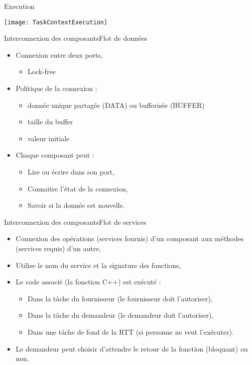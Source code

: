 \documentclass[compress]{beamer}
\begin{document}
\begin{frame}{Execution}
\begin{center}
\texttt{[image: TaskContextExecution]}
\end{center}
\end{frame}

\begin{frame}{Interconnexion des composants}{Flot de données}
\begin{itemize}
\item Connexion entre deux ports,
	\begin{itemize}
	\item Lock-free
	\end{itemize}
\item Politique de la connexion :
	\begin{itemize}
	\item donnée unique partagée (DATA) ou bufferisée (BUFFER)
	\item taille du buffer
	\item valeur initiale
	\end{itemize}
\item Chaque composant peut :
	\begin{itemize}
	\item Lire ou écrire dans son port,
	\item Connaitre l'état de la connexion,
	\item Savoir si la donnée  est nouvelle.
	\end{itemize}
\end{itemize}
\end{frame}

\begin{frame}{Interconnexion des composants}{Flot de services}
\begin{itemize}
\item Connexion des opérations (services fournis) d'un composant aux méthodes (services requis) d'un autre,
\item Utilise le nom du service et la signature des fonctions,
\item Le code associé (la fonction C++) est exécuté :
	\begin{itemize}
	\item Dans la tâche du fournisseur (le fournisseur doit l'autoriser),
	\item Dans la tâche du demandeur (le demandeur doit l'autoriser),
	\item Dans une tâche de fond de la RTT (si personne ne veut l'exécuter).
	\end{itemize}
\item Le demandeur peut choisir d'attendre le retour de la fonction (bloquant) ou non.
\end{itemize}
\end{frame}
\end{document}
